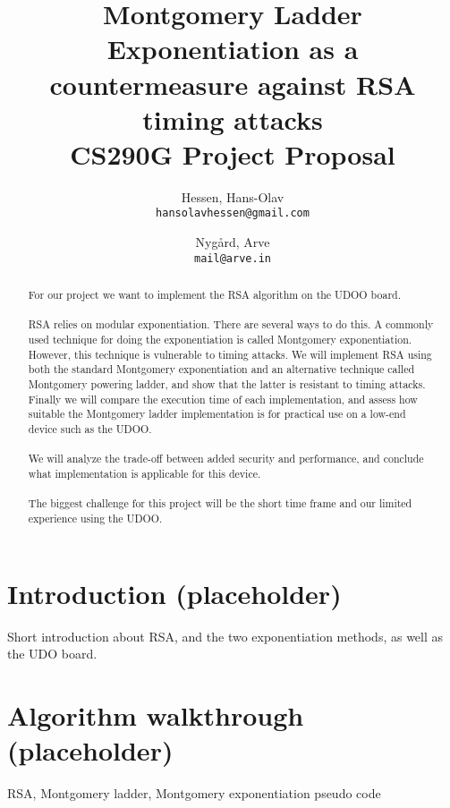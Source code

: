 \documentclass{article}
\begin{document}
\title{Montgomery Ladder Exponentiation as a countermeasure against RSA timing attacks \\
\large{CS290G Project Proposal}}

\author{
  Hessen, Hans-Olav\\
  \texttt{hansolavhessen@gmail.com}
  \and
  Nygård, Arve\\
  \texttt{mail@arve.in}
}
\maketitle

\begin{abstract}
\noindent For our project we want to implement the RSA algorithm on the UDOO board.\\
\\
RSA relies on modular exponentiation. There are several ways to do this. A commonly used technique for doing the exponentiation is called Montgomery exponentiation. However, this technique is vulnerable to timing attacks. We will implement RSA using both the standard Montgomery exponentiation and an alternative technique called Montgomery powering ladder, and show that the latter is resistant to timing attacks.
\\
Finally we will compare the execution time of each implementation, and assess how suitable the Montgomery ladder implementation is for practical use on a low-end device such as the UDOO.\\
\\
We will analyze the trade-off between added security and performance, and conclude what implementation is applicable for this device.\\
\\
The biggest challenge for this project will be the short time frame and our limited experience using the UDOO. 
\end{abstract}

\section {Introduction (placeholder)}
Short introduction about RSA, and the two exponentiation methods, as well as the UDO board.

\section{Algorithm walkthrough (placeholder)}
RSA, Montgomery ladder, Montgomery exponentiation pseudo code
\end{document}

